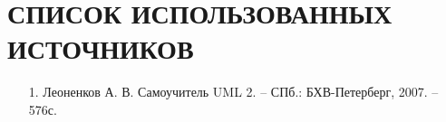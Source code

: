 \documentclass[12pt, a4paper, simple]{eskdtext}
\begin{document}
    \newpage
    \section*{СПИСОК ИСПОЛЬЗОВАННЫХ ИСТОЧНИКОВ}
    \begin{enumerate}
        \item[1.] Леоненков А. В.
        Самоучитель UML 2. -- СПб.: БХВ-Петерберг, 2007. -- 576с.
    \end{enumerate}
    \newpage
\end{document}
